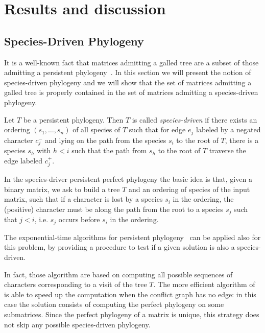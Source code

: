 \section*{Results and discussion}


\subsection*{Species-Driven Phylogeny}

It is a well-known fact that matrices admitting a galled tree are a
subset of those admitting a persistent phylogeny~\cite{gusfield_optimal_2004}.
In this section we will present the notion of species-driven phylogeny
and we will show that the set of  matrices admitting a galled tree is
properly contained in the set of matrices admitting a species-driven phylogeny.


\begin{definition}
\label{definition:species-driven}
Let $T$ be a persistent phylogeny.
Then $T$ is called \emph{species-driven} if there exists an ordering
$(s_{1}, \ldots , s_{n})$ of all species of $T$ such that for edge $e_{j}$
labeled by a negated character $c_{j}^{-}$  and lying on the path from
the species $s_{i}$ to the root of $T$, there is a species $s_{h}$
with $h < i$ such that the path from $s_{h}$ to the root of $T$
traverse the edge labeled $c_{j}^{+}$.
\end{definition}

In the species-driver persistent perfect phylogeny the basic idea is that, given  a binary matrix, we ask to build a tree  $T$ and an ordering of species  of the input matrix, such that if a character is lost by a species $s_i$ in the ordering, the (positive) character must be along the path from the root to a species $s_j$ such that $j < i$, i.e. $s_j$ occurs before $s_i$ in the ordering.

The exponential-time algorithms for persistent
phylogeny~\cite{DBLP:journals-tcs-BonizzoniBDT12,bonizzoni_explaining_2014}
can be applied also for this problem, by providing a procedure to test
if a given solution is also a species-driven.

In fact, those algorithm are based on computing all possible sequences
of characters corresponding to a visit of the tree $T$.
The more efficient algorithm of~\cite{bonizzoni_explaining_2014} is
able to speed up the computation when the conflict graph has no edge:
in this case the solution consists of computing the perfect phylogeny
on some submatrices.
Since the perfect phylogeny of a matrix is unique, this strategy does
not skip any possible species-driven phylogeny.

